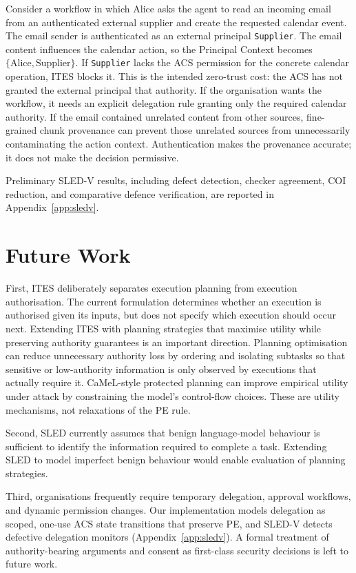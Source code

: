 \documentclass{article}
\begin{document}
Consider a workflow in which Alice asks the agent to read an incoming email
from an authenticated external supplier and create the requested calendar
event. The email sender is authenticated as an external principal
\texttt{Supplier}. The email content influences the calendar action, so the
Principal Context becomes $\{\text{Alice}, \text{Supplier}\}$. If
\texttt{Supplier} lacks the ACS permission for the concrete calendar
operation, ITES blocks it. This is the intended zero-trust cost: the ACS has
not granted the external principal that authority. If the organisation wants
the workflow, it needs an explicit delegation rule granting only the required
calendar authority. If the email contained unrelated content from other
sources, fine-grained chunk provenance can prevent those unrelated sources from
unnecessarily contaminating the action context. Authentication makes the
provenance accurate; it does not make the decision permissive.

Preliminary SLED-V results, including defect
detection, checker agreement, COI reduction, and comparative defence
verification, are reported in Appendix~\ref{app:sledv}.

\section{Future Work}
\label{sec:future}

First, ITES deliberately separates execution planning from execution
authorisation. The current formulation determines whether an execution is
authorised given its inputs, but does not specify which execution should occur
next. Extending ITES with planning strategies that maximise utility while
preserving authority guarantees is an important direction. Planning
optimisation can reduce unnecessary authority loss by ordering and isolating
subtasks so that sensitive or low-authority information is only observed by
executions that actually require it. CaMeL-style protected planning can
improve empirical utility under attack by constraining the model's
control-flow choices. These are utility mechanisms, not relaxations of the PE
rule.

Second, SLED currently assumes that benign language-model behaviour is
sufficient to identify the information required to complete a task. Extending
SLED to model imperfect benign behaviour would enable evaluation of planning
strategies.

Third, organisations frequently require temporary delegation, approval
workflows, and dynamic permission changes. Our implementation models
delegation as scoped, one-use ACS state transitions that preserve PE, and
SLED-V detects defective delegation monitors (Appendix~\ref{app:sledv}).
A formal treatment of authority-bearing arguments and consent as first-class
security decisions is left to future work.
\end{document}
